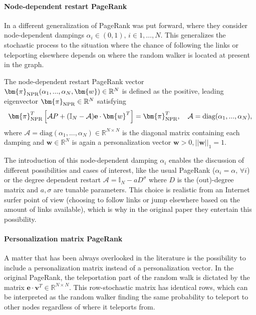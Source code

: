 \documentclass[sn-mathphys-ay]{sn-jnl}%
\newcommand{\R}{\mathbb{R}}
\newcommand{\I}{\mathbb{I}}
\newcommand{\bv}{\bm{v}}
\newcommand{\bw}{\bm{w}}
\newcommand{\be}{\mathbf{e}}
\newcommand{\cA}{\mathcal{A}}
\theoremstyle{thmstyleone}%
\theoremstyle{thmstyletwo}%
\theoremstyle{thmstylethree}%
\begin{document}
\paragraph{Node-dependent restart PageRank} 

In \cite{avrachenkov2014personalized} a different generalization of PageRank was put forward, where they consider node-dependent dampings $\alpha_i\in(0,1),\, i\in 1,\dots,N$. This generalizes the stochastic process to the situation where the chance of following the links or teleporting elsewhere depends on where the random walker is located at present in the graph. 


The node-dependent restart PageRank vector $\bm{\pi}_{\rm NPR}(\alpha_1, ..., \alpha_N, \bw)\in \R^{N}$ is defined as the positive, leading eigenvector $\bm{\pi}_{\rm NPR}\in\mathbb{R}^N$ satisfying
\begin{equation}\label{eq:NDRPageRank}
	\bm{\pi}_{\rm NPR}^T \left[\mathcal{A} P + (\I_N-\cA) \be \cdot  \bw^T\right] = \bm{\pi}_{\rm NPR}^T,\quad \cA = \text{diag}(\alpha_1, ..., \alpha_N),
\end{equation}
where $\cA=\text{diag}(\alpha_1, ..., \alpha_N) \in \R^{N\times N}$ is the diagonal matrix containing each damping and $\bw\in\R^N$ is again a personalization vector $\bw>0,||\bw||_1=1$. 


The introduction of this node-dependent damping $\alpha_i$ enables the discussion of different possibilities and cases of interest, like the usual PageRank ($\alpha_i=\alpha,\,\forall i$) or the degree dependent restart $\cA = \I_N - a D^\sigma$ where $D$ is the (out)-degree matrix and $a, \sigma$ are tunable parameters. This choice is realistic from an Internet surfer point of view (choosing to follow links or jump elsewhere based on the amount of links available), which is why in the original paper \cite{avrachenkov2014personalized} they entertain this possibility.



\paragraph{Personalization matrix PageRank}

A matter that has been always overlooked in the literature is the possibility to include a personalization matrix instead of a personalization vector. In the original PageRank, the teleportation part of the random walk is dictated by the matrix $\be\cdot \bv^T\in\R^{N\times N}$. This row-stochastic matrix has identical rows, which can be interpreted as the random walker finding the same probability to teleport to other nodes regardless of where it teleports from. 
\end{document}
